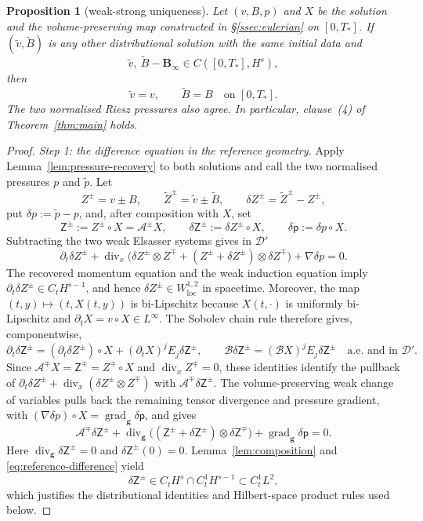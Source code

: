 \documentclass[11pt,reqno]{amsart}
\theoremstyle{plain}
\newtheorem{proposition}[theorem]{Proposition}
\theoremstyle{definition}
\theoremstyle{remark}
\numberwithin{equation}{section}
\DeclareMathOperator{\Div}{div}
\DeclareMathOperator{\grad}{grad}
\newcommand{\gmetric}{\mathbf g}
\newcommand{\Binf}{\mathbf B_\infty}
\begin{document}
\begin{proposition}[weak-strong uniqueness]
\label{prop:unconditional-uniqueness}
Let $(v,B,p)$ and $X$ be the solution and the volume-preserving map
constructed in \S\ref{ssec:eulerian} on $[0,T_*]$.
If $(\widetilde v,\widetilde B)$ is any other distributional solution with
the same initial data and
\[
 \widetilde v,\ \widetilde B-\Binf\in C([0,T_*],H^s),
\]
then
\[
 \widetilde v=v,\qquad \widetilde B=B
 \quad\text{on }[0,T_*].
\]
The two normalised Riesz pressures also agree. In particular, clause~\textup{(4)} of Theorem~\ref{thm:main} holds.
\end{proposition}

\begin{proof}
\emph{Step 1: the difference equation in the reference geometry.}
Apply Lemma~\ref{lem:pressure-recovery} to both solutions and call the two
normalised pressures $p$ and $\widetilde p$.  Let
\[
 Z^\pm=v\pm B,
 \qquad
 \widetilde Z^\pm=\widetilde v\pm\widetilde B,
 \qquad
 \delta Z^\pm=\widetilde Z^\pm-Z^\pm,
\]
put $\delta p:=\widetilde p-p$, and, after composition with $X$, set
\[
 \mathsf Z^\pm:=Z^\pm\circ X=\mathcal A^\pm X,
 \qquad
 \delta\mathsf Z^\pm:=\delta Z^\pm\circ X,
 \qquad
 \delta\mathsf p:=\delta p\circ X.
\]
Subtracting the two weak Elsasser systems gives in $\mathcal D'$
\[
 \partial_t\delta Z^\pm
 +\Div_x\bigl(\delta Z^\pm\otimes Z^\mp
 +(Z^\pm+\delta Z^\pm)\otimes\delta Z^\mp\bigr)
 +\nabla\delta p=0.
\]
The recovered momentum equation and the weak induction equation imply
$\partial_t\delta Z^\pm\in C_tH^{s-1}$, and hence
$\delta Z^\pm\in W^{1,2}_{\mathrm{loc}}$ in spacetime.  Moreover, the map
$(t,y)\mapsto(t,X(t,y))$ is bi-Lipschitz because $X(t,\cdot)$ is uniformly
bi-Lipschitz and $\partial_tX=v\circ X\in L^\infty$.  The Sobolev chain
rule therefore gives, componentwise,
\[
 \partial_t\delta\mathsf Z^\pm
 =(\partial_t\delta Z^\pm)\circ X
   +(\partial_tX)^jE_j\delta\mathsf Z^\pm,
 \qquad
 \mathcal B\delta\mathsf Z^\pm
 =(\mathcal BX)^jE_j\delta\mathsf Z^\pm
 \quad\text{a.e. and in }\mathcal D'.
\]
Since $\mathcal A^\mp X=\mathsf Z^\mp=Z^\mp\circ X$ and
$\Div_xZ^\mp=0$, these identities identify the pullback of
$\partial_t\delta Z^\pm+
\Div_x(\delta Z^\pm\otimes Z^\mp)$ with
$\mathcal A^\mp\delta\mathsf Z^\pm$.  The volume-preserving weak change of
variables pulls back the remaining tensor divergence and pressure gradient,
with $(\nabla\delta p)\circ X=\grad_{\gmetric}\delta\mathsf p$, and gives
\begin{equation}\label{eq:reference-difference}
 \mathcal A^\mp\delta\mathsf Z^\pm
 +\Div_{\gmetric}\bigl(
   (\mathsf Z^\pm+\delta\mathsf Z^\pm)
   \otimes\delta\mathsf Z^\mp\bigr)
 +\grad_{\gmetric}\delta\mathsf p=0.
\end{equation}
Here $\Div_{\gmetric}\delta\mathsf Z^\pm=0$ and
$\delta\mathsf Z^\pm(0)=0$.
Lemma~\ref{lem:composition} and \eqref{eq:reference-difference} yield
\[
 \delta\mathsf Z^\pm
 \in C_tH^s\cap C_t^1H^{s-1}\subset C_t^1L^2,
\]
which justifies the distributional identities and Hilbert-space product
rules used below.


\end{proof}
\end{document}
